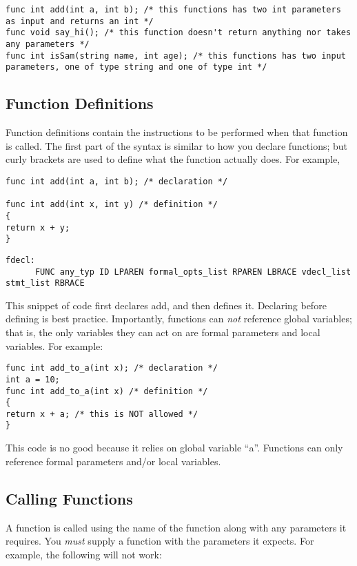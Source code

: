\documentclass{article}
\begin{document}
\begin{lstlisting}
func int add(int a, int b); /* this functions has two int parameters as input and returns an int */
func void say_hi(); /* this function doesn't return anything nor takes any parameters */
func int isSam(string name, int age); /* this functions has two input parameters, one of type string and one of type int */
\end{lstlisting}

\subsection{Function Definitions}
Function definitions contain the instructions to be performed when that function is called. The first part of the syntax is similar to how you declare functions; but curly brackets are used to define what the function actually does. For example, 

\begin{lstlisting}
func int add(int a, int b); /* declaration */

func int add(int x, int y) /* definition */
{
return x + y;
}
\end{lstlisting}

\begin{Verbatim}[frame=single]
fdecl:
	  FUNC any_typ ID LPAREN formal_opts_list RPAREN LBRACE vdecl_list stmt_list RBRACE
\end{Verbatim}

This snippet of code first declares add, and then defines it. Declaring before defining is best practice. Importantly, functions can \emph{not} reference global variables; that is, the only variables they can act on are formal parameters and local variables. For example:

\begin{lstlisting}
func int add_to_a(int x); /* declaration */
int a = 10;
func int add_to_a(int x) /* definition */
{
return x + a; /* this is NOT allowed */
}
\end{lstlisting}

This code is no good because it relies on global variable ``a''. Functions can only reference formal parameters and/or local variables.

\subsection{Calling Functions}

A function is called using the name of the function along with any parameters it requires. You \emph{must} supply a function with the parameters it expects. For example, the following will not work:
\end{document}
